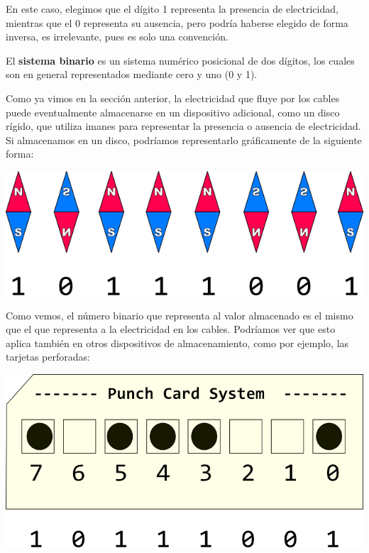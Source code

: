 En este caso, elegimos que el dígito 1 representa la presencia de electricidad,
mientras que el 0 representa su ausencia, pero podría haberse elegido de forma
inversa, es irrelevante, pues es solo una convención.

\begin{definition} El \textbf{sistema binario} es un sistema numérico
    posicional de dos dígitos, los cuales son en general representados mediante
    cero y uno (0 y 1).\autocite{laplante_2000}
\end{definition}

Como ya vimos en la sección anterior, la electricidad que fluye por los cables
puede eventualmente almacenarse en un dispositivo adicional, como un disco
rígido, que utiliza imanes para representar la presencia o ausencia de
electricidad. Si almacenamos en un disco, podríamos representarlo gráficamente
de la siguiente forma:

\centerline{\includegraphics[]{unidades/2_informacion/1_bajo_nivel/imagenes/binary_magnets.png}}

Como vemos, el número binario que representa al valor almacenado es el mismo que
el que representa a la electricidad en los cables. Podríamos ver que esto aplica
también en otros dispositivos de almacenamiento, como por ejemplo, las tarjetas
perforadas:

\centerline{\includegraphics[]{unidades/2_informacion/1_bajo_nivel/imagenes/binary_punchcard.png}}

